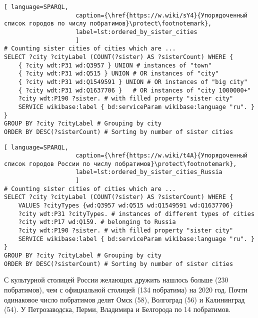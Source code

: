 \begin{lstlisting}[ language=SPARQL, 
                    caption={\href{https://w.wiki/sY4}{Упорядоченный список городов по числу побратимов}\protect\footnotemark},
                    label=lst:ordered_by_sister_cities
                    ]
# Counting sister cities of cities which are ...
SELECT ?city ?cityLabel (COUNT(?sister) AS ?sisterCount) WHERE {           
	{ ?city wdt:P31 wd:Q3957 } UNION # instances of "town"
	{ ?city wdt:P31 wd:Q515 } UNION # OR instances of "city"
	{ ?city wdt:P31 wd:Q1549591 } UNION # OR instances of "big city"
	{ ?city wdt:P31 wd:Q1637706 }	# OR instances of "city 1000000+"
	?city wdt:P190 ?sister. # with filled property "sister city"
	SERVICE wikibase:label { bd:serviceParam wikibase:language "ru". }
}
GROUP BY ?city ?cityLabel # Grouping by city                                   
ORDER BY DESC(?sisterCount) # Sorting by number of sister cities
\end{lstlisting}

\begin{lstlisting}[ language=SPARQL, 
                    caption={\href{https://w.wiki/t4A}{Упорядоченный список городов России по числу побратимов}\protect\footnotemark},
                    label=lst:ordered_by_sister_cities_Russia
                    ]
# Counting sister cities of cities which are ...
SELECT ?city ?cityLabel (COUNT(?sister) AS ?sisterCount) WHERE {           
	VALUES ?cityTypes {wd:Q3957 wd:Q515 wd:Q1549591 wd:Q1637706}
	?city wdt:P31 ?cityTypes. # instances of different types of cities
	?city wdt:P17 wd:Q159. # belonging to Russia
	?city wdt:P190 ?sister. # with filled property "sister city"
	SERVICE wikibase:label { bd:serviceParam wikibase:language "ru". }
}
GROUP BY ?city ?cityLabel # Grouping by city
ORDER BY DESC(?sisterCount) # Sorting by number of sister cities
\end{lstlisting}

С культурной столицей России желающих дружить нашлось больше (230 побратимов), чем с официальной столицей (134 побратима) на 2020 год. Почти одинаковое число побратимов делят Омск (58), Волгоград (56) и Калининград (54). У Петрозаводска, Перми, Владимира и Белгорода по 14 побратимов.

